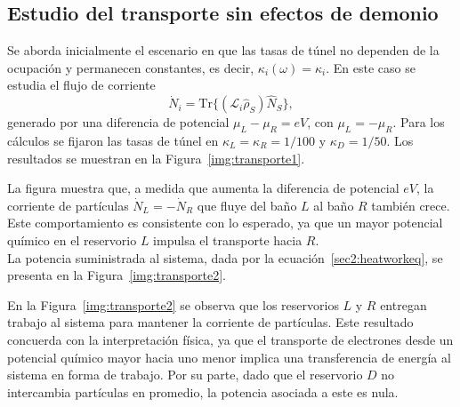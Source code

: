 \subsection{Estudio del transporte sin efectos de demonio}

Se aborda inicialmente el escenario en que las tasas de túnel no dependen de la ocupación y permanecen constantes, es decir, $\kappa_{i}(\omega) = \kappa_{i}$. En este caso se estudia el flujo de corriente
\[
\dot{N}_{i} = \mathrm{Tr}\{(\mathcal{L}_{i}\hat{\rho}_{S})\hat{N}_{S}\},
\]
generado por una diferencia de potencial $\mu_{L} - \mu_{R} = eV$, con $\mu_{L}=-\mu_{R}$. Para los cálculos se fijaron las tasas de túnel en $\kappa_{L} = \kappa_{R} = 1/100$ y $\kappa_{D} = 1/50$. Los resultados se muestran en la Figura~\ref{img:transporte1}.  


La figura muestra que, a medida que aumenta la diferencia de potencial $eV$, la corriente de partículas $\dot{N}_L = -\dot{N}_R$ que fluye del baño $L$ al baño $R$ también crece. Este comportamiento es consistente con lo esperado, ya que un mayor potencial químico en el reservorio $L$ impulsa el transporte hacia $R$.  
\\

La potencia suministrada al sistema, dada por la ecuación~\eqref{sec2:heatworkeq}, se presenta en la Figura~\ref{img:transporte2}.  

    
En la Figura~\ref{img:transporte2} se observa que los reservorios $L$ y $R$ entregan trabajo al sistema para mantener la corriente de partículas. Este resultado concuerda con la interpretación física, ya que el transporte de electrones desde un potencial químico mayor hacia uno menor implica una transferencia de energía al sistema en forma de trabajo. Por su parte, dado que el reservorio $D$ no intercambia partículas en promedio, la potencia asociada a este es nula.  
\\

